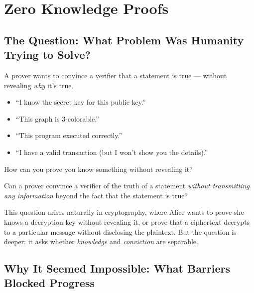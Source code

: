 
\chapter{Zero Knowledge Proofs}
\label{ch:zk}

\section{The Question: What Problem Was Humanity Trying to Solve?}
\label{sec:zk:question}

A prover wants to convince a verifier that a statement is true --- without revealing \emph{why} it's true.

\begin{itemize}
\item ``I know the secret key for this public key.''
\item ``This graph is 3-colorable.''
\item ``This program executed correctly.''
\item ``I have a valid transaction (but I won't show you the details).''
\end{itemize}

How can you prove you know something without revealing it?

Can a prover convince a verifier of the truth of a statement \emph{without transmitting any information} beyond the fact that the statement is true?

This question arises naturally in cryptography, where Alice wants to prove she knows a decryption key without revealing it, or prove that a ciphertext decrypts to a particular message without disclosing the plaintext. But the question is deeper: it asks whether \emph{knowledge} and \emph{conviction} are separable.

\section{Why It Seemed Impossible: What Barriers Blocked Progress}
\label{sec:zk:impossible}

